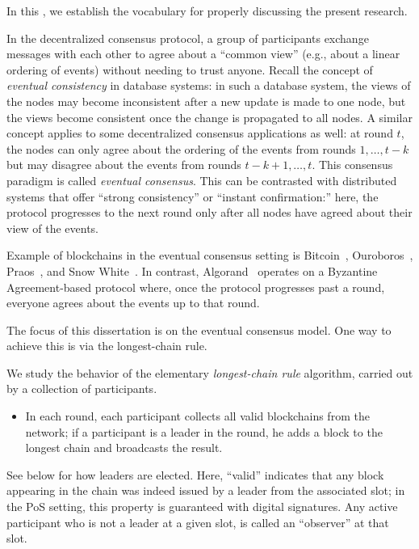 

In this \Section, 
we establish the vocabulary for properly discussing the present research.


In the decentralized consensus protocol, 
a group of participants exchange messages with each other 
to agree about a ``common view'' 
(e.g., about a linear ordering of events)
without needing to trust anyone. 
Recall the concept of \emph{eventual consistency} in database systems: 
in such a database system, 
the views of the nodes may become inconsistent after a new update is made to one node, 
but the views become consistent once the change is propagated to all nodes. 
A similar concept applies to some decentralized consensus applications as well: 
at round $t$, 
the nodes can only agree about the ordering of the events from rounds $1, \ldots, t-k$ 
but may disagree about the events from rounds $t-k+1, \ldots, t$. 
This consensus paradigm is called \emph{eventual consensus}.
This can be contrasted with distributed systems that offer ``strong consistency'' 
or ``instant confirmation:'' 
here, the protocol progresses to the next round 
only after all nodes have agreed about their view of the events.

Example of blockchains in the eventual consensus setting 
is Bitcoin~\cite{Nakamoto2008}, Ouroboros~\cite{Ouroboros}, Praos~\cite{Praos}, and Snow White~\cite{SnowWhite}. 
In contrast, Algorand~\cite{Algorand} operates on a 
Byzantine Agreement-based protocol where, 
once the protocol progresses past a round, 
everyone agrees about the events up to that round.

The focus of this dissertation is on the eventual consensus model.
One way to achieve this is via the longest-chain rule.


We study the behavior of the elementary \emph{longest-chain rule}
algorithm, carried out by a collection of participants. 
\begin{itemize}
  \item In each round,
  each participant collects all valid blockchains from the network; if a
  participant is a leader in the round, he adds a block to the longest
  chain and broadcasts the result.
\end{itemize}
See below for how leaders are elected.
Here, ``valid'' indicates that any block appearing in the
chain was indeed issued by a leader from the associated slot; in the
PoS setting, this property is guaranteed with digital
signatures.
Any active participant who is not a leader at a given slot, 
is called an ``observer'' at that slot.

